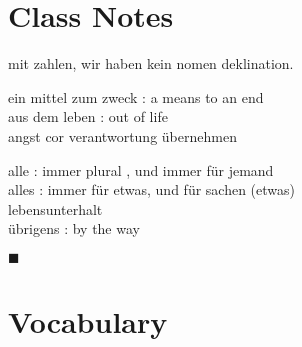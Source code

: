 \documentclass[a4paper,twocolumn,10pt]{article}
\begin{document}
\section{{Class Notes}}
\label{sec:class_notes}


mit zahlen, wir haben kein nomen deklination.\

ein mittel zum zweck : a means to an end\\
aus dem leben : out of life\\
angst cor verantwortung übernehmen

alle : immer plural , und immer für jemand\\
alles : immer für etwas, und für sachen (etwas)\\

lebensunterhalt\\
übrigens : by the way\\


\nolinenumbers \vspace{0.2cm}
\begin{center} $\blacksquare$ \end{center}
\linenumbers

\clearpage

\onecolumn
\section{{Vocabulary}}
\label{sec:vocabulary}
\nolinenumbers
\noindent

\end{document}
